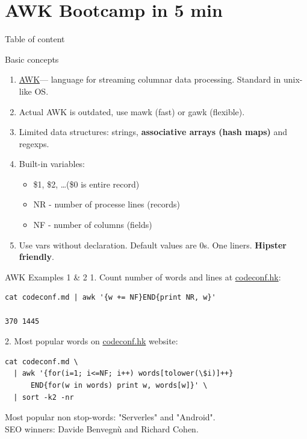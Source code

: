 \documentclass[unicode, notheorems, aspectratio=169]{beamer}
\begin{document}
\section{AWK Bootcamp in 5 min}
\begin{frame}{Table of content}
	\tableofcontents[currentsection]
\end{frame}
\begin{frame}{Basic concepts}
\begin{enumerate}
\item \href{https://en.wikipedia.org/wiki/AWK}{AWK}\footnotemark --- language for streaming columnar data processing. Standard in unix-like OS.
\item Actual AWK is outdated, use mawk (fast) or gawk (flexible).
\item Limited data structures: strings, \textbf{associative arrays (hash maps)} and regexps.
\item Built-in variables:
	\begin{itemize}
	\item \$1, \$2, \dots (\$0 is entire record)
	\item NR - number of processe lines (records)
	\item NF - number of columns (fields)
	\end{itemize}
\item Use vars without declaration. Default values are 0s. One liners. \textbf{Hipster friendly}.
\end{enumerate}
\end{frame}

\begin{frame}[fragile]{AWK Examples 1 \& 2}
1. Count number of words and lines at \href{http://codeconf.hk}{codeconf.hk}:
\begin{verbatim}
cat codeconf.md | awk '{w += NF}END{print NR, w}'

370 1445
\end{verbatim}
\vfill
2. Most popular words on \href{http://codeconf.hk}{codeconf.hk} website:
\begin{verbatim}
cat codeconf.md \
  | awk '{for(i=1; i<=NF; i++) words[tolower(\$i)]++}
      END{for(w in words) print w, words[w]}' \
  | sort -k2 -nr
\end{verbatim}

Most popular non stop-words: "Serverles" and "Android". \\
SEO winners: Davide Benvegn\`u and Richard Cohen.
\end{frame}
\end{document}
